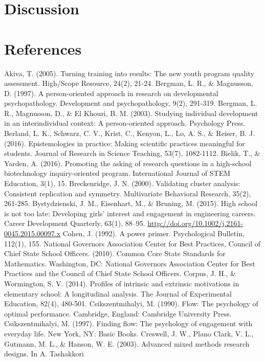 \documentclass[]{book}
\theoremstyle{definition}
\theoremstyle{definition}
\theoremstyle{definition}
\theoremstyle{remark}
\begin{document}
\chapter{Discussion}\label{discussion}

\chapter{References}\label{references}

Akiva, T. (2005). Turning training into results: The new youth program
quality assessment. High/Scope Resource, 24(2), 21-24. Bergman, L. R.,
\& Magnusson, D. (1997). A person-oriented approach in research on
developmental psychopathology. Development and psychopathology, 9(2),
291-319. Bergman, L. R., Magnusson, D., \& El Khouri, B. M. (2003).
Studying individual development in an interindividual context: A
person-oriented approach. Psychology Press. Berland, L. K., Schwarz, C.
V., Krist, C., Kenyon, L., Lo, A. S., \& Reiser, B. J. (2016).
Epistemologies in practice: Making scientific practices meaningful for
students. Journal of Research in Science Teaching, 53(7), 1082-1112.
Bielik, T., \& Yarden, A. (2016). Promoting the asking of research
questions in a high-school biotechnology inquiry-oriented program.
International Journal of STEM Education, 3(1), 15. Breckenridge, J. N.
(2000). Validating cluster analysis: Consistent replication and
symmetry. Multivariate Behavioral Research, 35(2), 261-285.
Bystydzienski, J. M., Eisenhart, M., \& Bruning, M. (2015). High school
is not too late: Developing girls' interest and engagement in
engineering careers. Career Development Quarterly, 63(1), 88--95.
\url{http://doi.org/10.1002/j.2161-0045.2015.00097.x} Cohen, J. (1992).
A power primer. Psychological Bulletin, 112(1), 155. National Governors
Association Center for Best Practices, Council of Chief State School
Officers. (2010). Common Core State Standards for Mathematics.
Washington, DC: National Governors Association Center for Best Practices
and the Council of Chief State School Officers. Corpus, J. H., \&
Wormington, S. V. (2014). Profiles of intrinsic and extrinsic
motivations in elementary school: A longitudinal analysis. The Journal
of Experimental Education, 82(4), 480-501. Csikszentmihalyi, M. (1990).
Flow: The psychology of optimal performance. Cambridge, England:
Cambridge University Press. Csikszentmihalyi, M. (1997). Finding flow:
The psychology of engagement with everyday life. New York, NY: Basic
Books. Creswell, J. W., Plano Clark, V. L., Gutmann, M. L., \& Hanson,
W. E. (2003). Advanced mixed methods research designs. In A. Tashakkori
\end{document}
